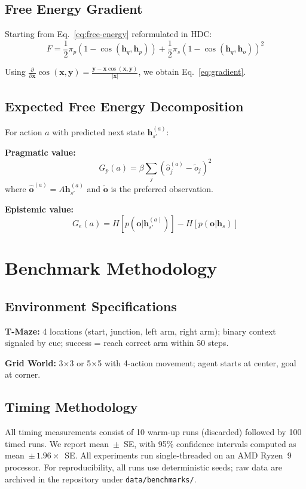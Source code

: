 \documentclass[10pt,letterpaper]{article}
\newcommand{\hvec}[1]{\mathbf{h}_{#1}}
\begin{document}
\subsection{Free Energy Gradient}

Starting from Eq.~\ref{eq:free-energy} reformulated in HDC:
\begin{equation}
F = \frac{1}{2}\pi_p(1 - \cos(\hvec{q}, \hvec{p})) + \frac{1}{2}\pi_s(1 - \cos(\hvec{q}, \hvec{o}))^2
\end{equation}

Using $\frac{\partial}{\partial \mathbf{x}}\cos(\mathbf{x}, \mathbf{y}) = \frac{\mathbf{y} - \mathbf{x}\cos(\mathbf{x}, \mathbf{y})}{|\mathbf{x}|}$, we obtain Eq.~\ref{eq:gradient}.

\subsection{Expected Free Energy Decomposition}

For action $a$ with predicted next state $\hvec{s'}^{(a)}$:

\textbf{Pragmatic value:}
\begin{equation}
G_p(a) = \beta \sum_j (\hat{o}_j^{(a)} - \tilde{o}_j)^2
\end{equation}
where $\hat{\mathbf{o}}^{(a)} = A\hvec{s'}^{(a)}$ and $\tilde{\mathbf{o}}$ is the preferred observation.

\textbf{Epistemic value:}
\begin{equation}
G_e(a) = H[p(\mathbf{o}|\hvec{s'}^{(a)})] - H[p(\mathbf{o}|\hvec{s})]
\end{equation}

\section{Benchmark Methodology}
\label{app:methodology}

\subsection{Environment Specifications}

\textbf{T-Maze:} 4 locations (start, junction, left arm, right arm); binary context signaled by cue; success = reach correct arm within 50 steps.

\textbf{Grid World:} 3$\times$3 or 5$\times$5 with 4-action movement; agent starts at center, goal at corner.

\subsection{Timing Methodology}

All timing measurements consist of 10 warm-up runs (discarded) followed by 100 timed runs. We report mean~$\pm$~SE, with 95\% confidence intervals computed as mean~$\pm\,1.96 \times$~SE. All experiments run single-threaded on an AMD Ryzen~9 processor. For reproducibility, all runs use deterministic seeds; raw data are archived in the repository under \texttt{data/\allowbreak benchmarks/}.
\end{document}
